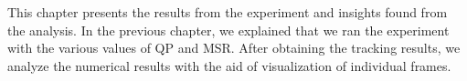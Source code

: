 This chapter presents the results from the experiment and insights found from the analysis. In the previous chapter, we explained that we ran the experiment with the various values of QP and MSR. After obtaining the tracking results, we analyze the numerical results with the aid of visualization of individual frames.